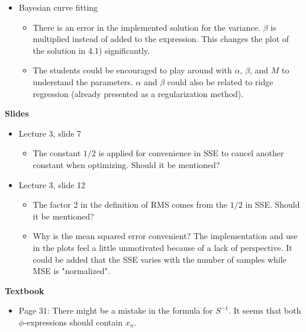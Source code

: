 \documentclass{article}
\begin{document}
\begin{itemize}
    \item[4] Bayesian curve fitting
    \begin{itemize}
        \item There is an error in the implemented solution for the variance. $\beta$ is multiplied instead of added to the expression. This changes the plot of the solution in 4.1) significantly.
        \item The students could be encouraged to play around with $\alpha$, $\beta$, and $M$ to understand the parameters. $\alpha$ and $\beta$ could also be related to ridge regression (already presented as a regularization method).
    \end{itemize}
\end{itemize}

\textbf{Slides}

\begin{itemize}
    \item Lecture 3, slide 7
    \begin{itemize}
        \item The constant $1/2$ is applied for convenience in SSE to cancel another constant when optimizing. Should it be mentioned?
    \end{itemize}
    \item Lecture 3, slide 12
    \begin{itemize}
        \item The factor 2 in the definition of RMS comes from the $1/2$ in SSE. Should it be mentioned?
        \item Why is the mean squared error convenient? The implementation and use in the plots feel a little unmotivated because of a lack of perspective. It could be added that the SSE varies with the number of samples while MSE is "normalized".
    \end{itemize}
\end{itemize}

\textbf{Textbook}

\begin{itemize}
    \item Page 31: There might be a mistake in the formula for $S^{-1}$. It seems that both $\phi$-expressions should contain $x_n$.
\end{itemize}
\end{document}
